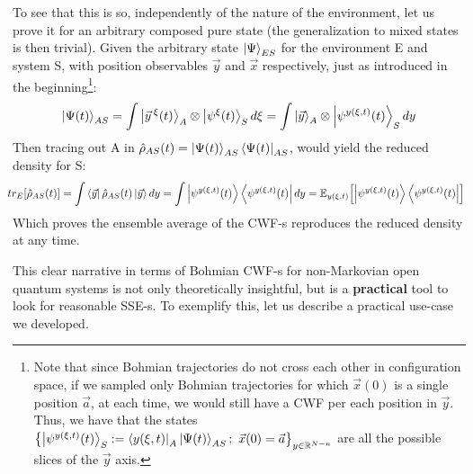 \documentclass[11pt, a4paper]{article} %
\newcommand{\R}{\mathbb{R}} %
\begin{document}
To see that this is so, independently of the nature of the environment, let us prove it for an arbitrary composed pure state (the generalization to mixed states is then trivial). Given the arbitrary state $\ket{\Psi}_{ES}$ for the environment E and system S, with position observables $\vec{y}$ and $\vec{x}$ respectively, just as introduced in the beginning\footnote{Note that since Bohmian trajectories do not cross each other in configuration space, if we sampled only Bohmian trajectories for which $\vec{x}(0)$ is a single position $\vec{a}$, at each time, we would still have a CWF per each position in $\vec{y}$. Thus, we have that the states $\qty{\ket{\psi^{y(\xi,t)}(t)}_S:=\bra{y(\xi,t)}_A\ket{\Psi(t)}_{AS};\ \vec{x}(0)=\vec{a}}_{y\in\R^{N-n}}$ are all the possible slices of the $\vec{y}$ axis.}:\vspace{-0.2cm}
\begin{equation}
\ket{\Psi(t)}_{AS}=\int\ket{\vec{y}^{\:\xi}(t)}_A\otimes \ket{\psi^\xi(t)}_S d\xi = \int\ket{\vec{y}}_A\otimes \ket{\psi^{y(\xi,t)}(t)}_S dy
\end{equation}
Then tracing out A in $\hat{\rho}_{AS}(t)=\ket{\Psi(t)}_{AS}\bra{\Psi(t)}_{AS}$, would yield the reduced density for S:
\begin{equation}\hspace{-0.2cm}
tr_E\qty[\hat{\rho}_{AS}(t)] = \int\bra{\vec{y}}\hat{\rho}_{AS}(t)\ket{\vec{y}}dy = \int \ket{\psi^{y(\xi,t)}(t)}\bra{\psi^{y(\xi,t)}(t)} dy = \mathbb{E}_{y(\xi,t)}\qty[\ket{\psi^{y(\xi,t)}(t)}\bra{\psi^{y(\xi,t)}(t)}]
\end{equation}
Which proves the ensemble average of the CWF-s reproduces the reduced density at any time.\vspace{-0.15cm}

This clear narrative in terms of Bohmian CWF-s for non-Markovian open quantum systems is not only theoretically insightful, but is a {\bf practical} tool to look for reasonable SSE-s. To exemplify this, let us describe a practical use-case we developed.\vspace{-0.2cm}
\end{document}
